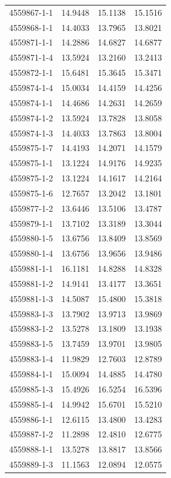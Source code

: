 \begin{longtable}{lrrr}
4559867-1-1 & 14.9448 & 15.1138 & 15.1516 \\
4559868-1-1 & 14.4033 & 13.7965 & 13.8021 \\
4559871-1-1 & 14.2886 & 14.6827 & 14.6877 \\
4559871-1-4 & 13.5924 & 13.2160 & 13.2413 \\
4559872-1-1 & 15.6481 & 15.3645 & 15.3471 \\
4559874-1-4 & 15.0034 & 14.4159 & 14.4256 \\
4559874-1-1 & 14.4686 & 14.2631 & 14.2659 \\
4559874-1-2 & 13.5924 & 13.7828 & 13.8058 \\
4559874-1-3 & 14.4033 & 13.7863 & 13.8004 \\
4559875-1-7 & 14.4193 & 14.2071 & 14.1579 \\
4559875-1-1 & 13.1224 & 14.9176 & 14.9235 \\
4559875-1-2 & 13.1224 & 14.1617 & 14.2164 \\
4559875-1-6 & 12.7657 & 13.2042 & 13.1801 \\
4559877-1-2 & 13.6446 & 13.5106 & 13.4787 \\
4559879-1-1 & 13.7102 & 13.3189 & 13.3044 \\
4559880-1-5 & 13.6756 & 13.8409 & 13.8569 \\
4559880-1-4 & 13.6756 & 13.9656 & 13.9486 \\
4559881-1-1 & 16.1181 & 14.8288 & 14.8328 \\
4559881-1-2 & 14.9141 & 13.4177 & 13.3651 \\
4559881-1-3 & 14.5087 & 15.4800 & 15.3818 \\
4559883-1-3 & 13.7902 & 13.9713 & 13.9869 \\
4559883-1-2 & 13.5278 & 13.1809 & 13.1938 \\
4559883-1-5 & 13.7459 & 13.9701 & 13.9805 \\
4559883-1-4 & 11.9829 & 12.7603 & 12.8789 \\
4559884-1-1 & 15.0094 & 14.4885 & 14.4780 \\
4559885-1-3 & 15.4926 & 16.5254 & 16.5396 \\
4559885-1-4 & 14.9942 & 15.6701 & 15.5210 \\
4559886-1-1 & 12.6115 & 13.4800 & 13.4283 \\
4559887-1-2 & 11.2898 & 12.4810 & 12.6775 \\
4559888-1-1 & 13.5278 & 13.8817 & 13.8566 \\
4559889-1-3 & 11.1563 & 12.0894 & 12.0575 \\

\end{longtable}
